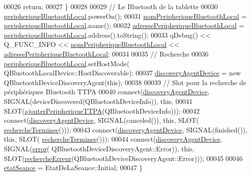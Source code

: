 \begin{DoxyCode}
00026         \textcolor{keywordflow}{return};
00027     \}
00028 
00029     \textcolor{comment}{// Le Bluetooth de la tablette}
00030     \hyperlink{class_communication_bluetooth_a03c857db65a9ea5a0b944844f675e6fa}{peripheriqueBluetoothLocal}.powerOn();
00031     \hyperlink{class_communication_bluetooth_a6781eed73c4b5db0fe7ff94c034f2cf5}{nomPeripheriqueBluetoothLocal} = 
      \hyperlink{class_communication_bluetooth_a03c857db65a9ea5a0b944844f675e6fa}{peripheriqueBluetoothLocal}.name();
00032     \hyperlink{class_communication_bluetooth_a972265a71842606740b53560a7fc0e53}{adressePeripheriqueBluetoothLocal} = 
      \hyperlink{class_communication_bluetooth_a03c857db65a9ea5a0b944844f675e6fa}{peripheriqueBluetoothLocal}.address().toString();
00033     qDebug() << Q\_FUNC\_INFO << \hyperlink{class_communication_bluetooth_a6781eed73c4b5db0fe7ff94c034f2cf5}{nomPeripheriqueBluetoothLocal} << 
      \hyperlink{class_communication_bluetooth_a972265a71842606740b53560a7fc0e53}{adressePeripheriqueBluetoothLocal};
00034 
00035     \textcolor{comment}{// Recherche}
00036     \hyperlink{class_communication_bluetooth_a03c857db65a9ea5a0b944844f675e6fa}{peripheriqueBluetoothLocal}.setHostMode(
      QBluetoothLocalDevice::HostDiscoverable);
00037     \hyperlink{class_communication_bluetooth_a9e04dbd88ba090525d6691cc1a4237b6}{discoveryAgentDevice} = \textcolor{keyword}{new} QBluetoothDeviceDiscoveryAgent(\textcolor{keyword}{this});
00038 
00039     \textcolor{comment}{// Slot pour la recherche de périphériques Bluetooth TTPA}
00040     connect(\hyperlink{class_communication_bluetooth_a9e04dbd88ba090525d6691cc1a4237b6}{discoveryAgentDevice}, SIGNAL(deviceDiscovered(QBluetoothDeviceInfo)), \textcolor{keyword}{this},
00041 SLOT(\hyperlink{class_communication_bluetooth_a53bc4772892ec57f030600e49fa0b6ff}{ajouterPeripheriqueTTPA}(QBluetoothDeviceInfo)));
00042     connect(\hyperlink{class_communication_bluetooth_a9e04dbd88ba090525d6691cc1a4237b6}{discoveryAgentDevice}, SIGNAL(canceled()), \textcolor{keyword}{this}, SLOT(
      \hyperlink{class_communication_bluetooth_a79ee5a5bcaaf265048f1213b5504f146}{rechercheTerminee}()));
00043     connect(\hyperlink{class_communication_bluetooth_a9e04dbd88ba090525d6691cc1a4237b6}{discoveryAgentDevice}, SIGNAL(finished()), \textcolor{keyword}{this}, SLOT(
      \hyperlink{class_communication_bluetooth_a79ee5a5bcaaf265048f1213b5504f146}{rechercheTerminee}()));
00044     connect(\hyperlink{class_communication_bluetooth_a9e04dbd88ba090525d6691cc1a4237b6}{discoveryAgentDevice}, SIGNAL(\hyperlink{class_communication_bluetooth_a6e0d7054012e11af9d55d6d4f5764259}{error}(
      QBluetoothDeviceDiscoveryAgent::Error)), \textcolor{keyword}{this}, SLOT(\hyperlink{class_communication_bluetooth_ad9abca9e2e3fa0115cc92458a357e04d}{rechercheErreur}(QBluetoothDeviceDiscoveryAgent::Error)));
00045 
00046     \hyperlink{class_communication_bluetooth_adc66f3034d46f3964a26b62ad98e784f}{etatSeance} = EtatDeLaSeance::Initial;
00047 \}
\end{DoxyCode}

